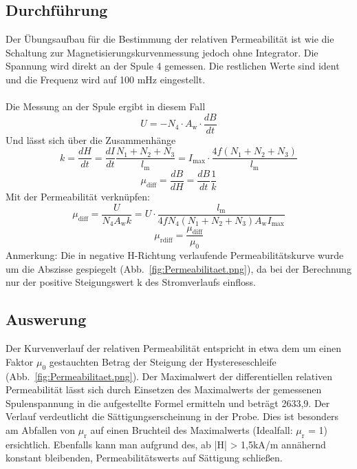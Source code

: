 \documentclass[a4paper,twoside,12pt,DIV=13,BCOR=5mm,numbers=noenddot,cleardoublepage=empty]{scrbook}
\begin{document}
        \subsection{Durchf\"uhrung}
        Der \"Ubungsaufbau f\"ur die Bestimmung der relativen Permeabilit\"at ist wie die Schaltung zur Magnetisierungskurvenmessung jedoch ohne Integrator. Die Spannung wird direkt an der Spule 4 gemessen. Die restlichen Werte sind ident und die Frequenz wird auf 100 mHz eingestellt.
        \\
        \\
        Die Messung an der Spule ergibt in diesem Fall
        \begin{equation}
            U = - N_\mathrm{4} \cdot A_\mathrm{w} \cdot \frac{dB}{dt}
        \end{equation}
        Und l\"asst sich \"uber die Zusammenh\"ange
        \begin{equation}
            k = \frac{dH}{dt} = \frac{dI}{dt} \frac{N_\mathrm{1} + N_\mathrm{2} + N_\mathrm{3}}{l_\mathrm{m}} = I_\mathrm{max} \cdot \frac{4f(N_\mathrm{1} + N_\mathrm{2} + N_\mathrm{3})}{l_\mathrm{m}}
        \end{equation}
        \begin{equation}
            \mu_\mathrm{diff} = \frac{dB}{dH} = \frac{dB}{dt} \frac{1}{k}
        \end{equation}
        Mit der Permeabilit\"at verkn\"upfen:
        \begin{equation}
            \mu_\mathrm{diff} = \frac{U}{N_\mathrm{4}A_\mathrm{w}k} = U \cdot \frac{l_\mathrm{m}}{4fN_\mathrm{4}(N_\mathrm{1} + N_\mathrm{2} + N_\mathrm{3})A_\mathrm{w}I_\mathrm{max}}
        \end{equation}
        \begin{equation}
            \mu_\mathrm{rdiff} = \frac{\mu_\mathrm{diff}}{\mu_\mathrm{0}}
        \end{equation}
        Anmerkung: Die in negative H-Richtung verlaufende Permeabilit\"atskurve wurde um die Abszisse gespiegelt (Abb.~\ref{fig:Permeabilitaet.png}), da bei der Berechnung nur der positive Steigungswert k des Stromverlaufs einfloss.
        \subsection{Auswerung}
        Der Kurvenverlauf der relativen Permeabilit\"at entspricht in etwa dem 
        um einen Faktor $\mu_\mathrm{0}$ gestauchten Betrag der Steigung der 
        Hystereseschleife (Abb.~\ref{fig:Permeabilitaet.png}). Der Maximalwert der differentiellen 
        relativen Permeabilit\"at l\"asst sich durch Einsetzen des Maximalwerts 
        der gemessenen Spulenspannung in die aufgestellte Formel ermitteln und 
        betr\"agt 2633,9. Der Verlauf verdeutlicht die S\"attigungserscheinung in 
        der Probe. Dies ist besonders am Abfallen von $\mu_\mathrm{r}$ auf einen Bruchteil 
        des Maximalwerts (Idealfall: $\mu_\mathrm{r}$ = 1) ersichtlich. Ebenfalls kann man 
        aufgrund des, ab |H| > 1,5kA/m ann\"ahernd konstant bleibenden, 
        Permeabilit\"atswerts auf S\"attigung schlie\ss{}en.
\end{document}
